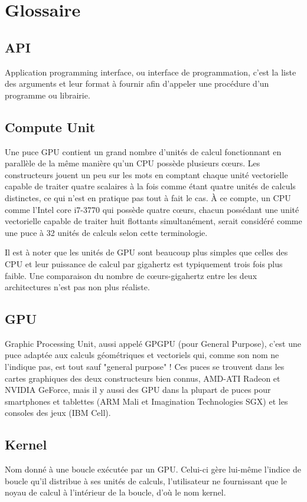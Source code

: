 \documentclass[a4paper,12pt]{article}
\begin{document}
\section{Glossaire}

\subsection{API}
Application programming interface, ou interface de programmation, c'est la liste des arguments et leur format à fournir afin d'appeler une procédure d'un programme ou librairie.

\subsection{Compute Unit}
Une puce GPU contient un grand nombre d'unités de calcul fonctionnant en parallèle de la même manière qu'un CPU possède plusieurs c\oe urs. Les constructeurs jouent un peu sur les mots en comptant chaque unité vectorielle capable de traiter quatre scalaires à la fois comme étant quatre unités de calculs distinctes, ce qui n'est en pratique pas tout à fait le cas. À ce compte, un CPU comme l'Intel core i7-3770 qui possède quatre c\oe urs, chacun possédant une unité vectorielle capable de traiter huit flottants simultanément, serait considéré comme une puce à 32 unités de calculs selon cette terminologie.

Il est à noter que les unités de GPU sont beaucoup plus simples que celles des CPU et leur puissance de calcul par gigahertz est typiquement trois fois plus faible. Une comparaison du nombre de c\oe urs-gigahertz entre les deux architectures n'est pas non plus réaliste.

\subsection{GPU}
Graphic Processing Unit, aussi appelé GPGPU (pour General Purpose), c'est une puce adaptée aux calculs géométriques et vectoriels qui, comme son nom ne l'indique pas, est tout sauf "general purpose" !
Ces puces se trouvent dans les cartes graphiques des deux constructeurs bien connus, AMD-ATI Radeon et NVIDIA GeForce, mais il y aussi des GPU dans la plupart de puces pour smartphones et tablettes (ARM Mali et Imagination Technologies SGX) et les consoles des jeux (IBM Cell).

\subsection{Kernel}
Nom donné à une boucle exécutée par un GPU. Celui-ci gère lui-même l'indice de boucle qu'il distribue à ses unités de calculs, l'utilisateur ne fournissant que le noyau de calcul à l'intérieur de la boucle, d'où le nom kernel.
\end{document}
